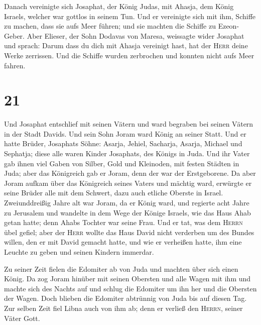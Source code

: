 Danach vereinigte sich Josaphat, der König Judas, mit
Ahasja, dem König Israels, welcher war gottlos in seinem Tun.
 Und er vereinigte sich mit ihm, Schiffe zu machen, dass
sie aufs Meer führen; und sie machten die Schiffe zu Ezeon-Geber.
 Aber Elieser, der Sohn Dodavas von Maresa, weissagte
wider Josaphat und sprach: Darum dass du dich mit Ahasja vereinigt hast,
hat der \textsc{Herr} deine Werke zerrissen. Und die Schiffe wurden
zerbrochen und konnten nicht aufs Meer fahren.

\hypertarget{section-20}{%
\section{21}\label{section-20}}

 Und Josaphat entschlief mit seinen Vätern und ward
begraben bei seinen Vätern in der Stadt Davids. Und sein Sohn Joram ward
König an seiner Statt.  Und er hatte Brüder, Josaphats
Söhne: Asarja, Jehiel, Sacharja, Asarja, Michael und Sephatja; diese
alle waren Kinder Josaphats, des Königs in Juda.  Und ihr
Vater gab ihnen viel Gaben von Silber, Gold und Kleinoden, mit festen
Städten in Juda; aber das Königreich gab er Joram, denn der war der
Erstgeborene.  Da aber Joram aufkam über das Königreich
seines Vaters und mächtig ward, erwürgte er seine Brüder alle mit dem
Schwert, dazu auch etliche Oberste in Israel. 
Zweiunddreißig Jahre alt war Joram, da er König ward, und regierte acht
Jahre zu Jerusalem  und wandelte in dem Wege der Könige
Israels, wie das Haus Ahab getan hatte; denn Ahabs Tochter war seine
Frau. Und er tat, was dem \textsc{Herrn} übel gefiel; 
aber der \textsc{Herr} wollte das Haus David nicht verderben um des
Bundes willen, den er mit David gemacht hatte, und wie er verheißen
hatte, ihm eine Leuchte zu geben und seinen Kindern immerdar.

 Zu seiner Zeit fielen die Edomiter ab von Juda und
machten über sich einen König.  Da zog Joram hinüber mit
seinen Obersten und alle Wagen mit ihm und machte sich des Nachts auf
und schlug die Edomiter um ihn her und die Obersten der Wagen.
 Doch blieben die Edomiter abtrünnig von Juda bis auf
diesen Tag. Zur selben Zeit fiel Libna auch von ihm ab; denn er verließ
den \textsc{Herrn}, seiner Väter Gott.


